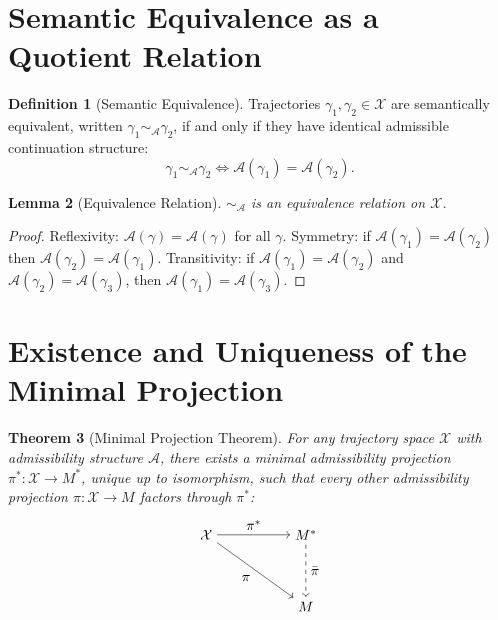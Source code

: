 \documentclass[12pt, oneside]{book}
\theoremstyle{flyxion}
\newtheorem{theorem}{Theorem}[chapter]
\newtheorem{lemma}[theorem]{Lemma}
\theoremstyle{definition}
\newtheorem{definition}[theorem]{Definition}
\begin{document}
\section{Semantic Equivalence as a Quotient Relation}

\begin{definition}[Semantic Equivalence]
Trajectories $\gamma_1, \gamma_2 \in \mathcal{X}$ are
semantically equivalent, written $\gamma_1 \sim_{\mathcal{A}}
\gamma_2$, if and only if they have identical admissible
continuation structure:
\[
\gamma_1 \sim_{\mathcal{A}} \gamma_2 \iff
\mathcal{A}(\gamma_1) = \mathcal{A}(\gamma_2).
\]
\end{definition}

\begin{lemma}[Equivalence Relation]
$\sim_{\mathcal{A}}$ is an equivalence relation on
$\mathcal{X}$.
\end{lemma}

\begin{proof}
Reflexivity: $\mathcal{A}(\gamma) = \mathcal{A}(\gamma)$
for all $\gamma$. Symmetry: if
$\mathcal{A}(\gamma_1) = \mathcal{A}(\gamma_2)$ then
$\mathcal{A}(\gamma_2) = \mathcal{A}(\gamma_1)$.
Transitivity: if $\mathcal{A}(\gamma_1) =
\mathcal{A}(\gamma_2)$ and $\mathcal{A}(\gamma_2) =
\mathcal{A}(\gamma_3)$, then $\mathcal{A}(\gamma_1) =
\mathcal{A}(\gamma_3)$.
\end{proof}

\section{Existence and Uniqueness of the Minimal Projection}

\begin{theorem}[Minimal Projection Theorem]
\label{thm:minimal_projection}
For any trajectory space $\mathcal{X}$ with admissibility
structure $\mathcal{A}$, there exists a minimal admissibility
projection $\pi^* : \mathcal{X} \to M^*$, unique up to
isomorphism, such that every other admissibility projection
$\pi : \mathcal{X} \to M$ factors through $\pi^*$:
\[
\begin{tikzpicture}[baseline=(current bounding box.center)]
\node (X) {$\mathcal{X}$};
\node (Mstar) [right of=X, xshift=1.5cm] {$M^*$};
\node (M) [below of=Mstar, yshift=-0.8cm] {$M$};
\draw[->] (X) -- node[above] {$\pi^*$} (Mstar);
\draw[->] (X) -- node[below left] {$\pi$} (M);
\draw[->, dashed] (Mstar) -- node[right] {$\bar\pi$} (M);
\end{tikzpicture}
\]
\end{theorem}
\end{document}
